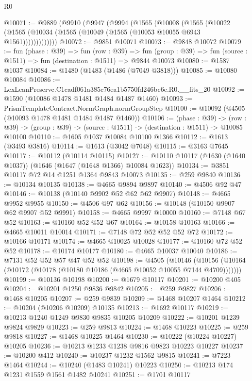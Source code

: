 \begin{lexlean}{R0}
\begin{coremodule}
@10071 := @9889
    (@9910
      (@9947
        (@9994
          (@1565
            (@10008
              (@1565
                (@10022 (@1565 (@10034 (@1565 (@10049 (@1565 (@10053 @10055 @6943 @1561)))))))))))))
@10072 := @9851 @10071
@10073 := @9848 @10072
@10079 := fun (phase : @39) =>
  fun (row : @39) =>
  fun (group : @39) => fun (source : @1511) => fun (destination : @1511) => @9844 @10073
@10080 := @1587 @1037
@10084 := @1480 (@1483 (@1486 (@7049 @3818)))
@10085 := @10080 @10084
@10086 := LexLeanPreserve.C1cadf061a385c76ea1b5750fd246bc6e.R0.__fits_20
@10092 := @1590 (@10086 @1478 @1481 @1484 @1487 @1460)
@10093 := PrismTemplateContract.NormGraph.normGroupStep
@10100 := @10092 (@4505 (@10093 @1478 @1481 @1484 @1487 @1460))
@10106 := (phase : @39) ->
  (row : @39) -> (group : @39) -> (source : @1511) -> (destination : @1511) -> @10085 @10100
@10110 := @1605 @1037 @10084 @10100 @1366
@10112 := @1613 (@3493 @3816)
@10114 := @1613 (@3042 @7048)
@10115 := @3163 @7645
@10117 := @10112 (@10114 @10115)
@10127 := @10110 @10117 (@1630 (@1640 @1037)) (@1646 (@1647 (@1648 @1366) @10084 @1623))
@10134 := @3851 @10117 @72 @14 @1251 @1364 @9843 @10073
@10135 := @259 @9840
@10136 := @10134 @10135
@10138 := @4665 @9894 @9897
@10140 := @4506 @92 @47
@10146 := @10138 (@10140 @9902 @52 @62 @62 @9907)
@10148 := @4665 @9952 @9955
@10150 := @4506 @97 @62
@10156 := @10148 (@10150 @9907 @62 @9907 @52 @9991)
@10158 := @4665 @9997 @10000
@10160 := @7148 @67 @52
@10163 := @10160 @52 @52 @67
@10164 := @10158 @10163
@10166 := @4665 @10011 @10014
@10171 := @7148 @72 @52 @52 @52 @72
@10172 := @10166 @10171
@10174 := @4665 @10025 @10028
@10177 := @10160 @72 @52 @52
@10178 := @10174 @10177
@10180 := @4665 @10037 @10040
@10186 := @7131 @52 @52 @57 @47 @52 @52
@10198 := @4505
    (@10146 (@10156 (@10164 (@10172 (@10178 (@10180 @10186 (@4665 @10052 @10055 @7144 @4709)))))))
@10199 := @10136 @10198
@10200 := @1679 @10117
@10201 := @10200 @405
@10204 := @10201 @1250 @9836 @9842
@10205 := @259 @9827
@10206 := @1468 @10205
@10207 := @259 @9839
@10209 := @1468 @10207 @1464
@10212 := @10204 (@10206 @10209) @10135
@10213 := @1692 @10117
@10219 := @10213 @1240 @1249 @9830 @9835 @10205 @10209
@10222 := @10201 @1239 @9824 @9829
@10223 := @259 @9813
@10224 := @1468 @10223
@10225 := @259 @9818
@10227 := @1468 @10225 @1464
@10230 := @10222 (@10224 @10227) @10205
@10236 := @10213 @1233 @1238 @9816 @9823 @10223 @10227
@10237 := @10200 @412
@10240 := @10237 @1232 @1562 @9815
@10241 := @7223 @1464
@10244 := @10240 (@1483 @10241) @10223
@10250 := @10213 @174 @1231 @1559 @1561 @1482 @10241
@10251 := @1701 @10117

\end{coremodule}
\end{lexlean}
